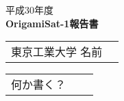 \begin{titlepage}

\vspace*{10pt} 

\begin{center}

\Large{平成30年度} \\
\vspace*{210pt}
\huge{\bf OrigamiSat-1報告書} \\ 
\vspace*{130pt}

\end{center}

\vspace*{80pt}

\begin{center}

\Large{
	\begin{tabular}{cc}
		東京工業大学
		\vspace{10pt}
		名前
	\end{tabular}
}

\vspace{20pt}


\Large{
	\begin{tabular}{cll}
		何か書く？
	\end{tabular}
}

\end{center}

\end{titlepage}
